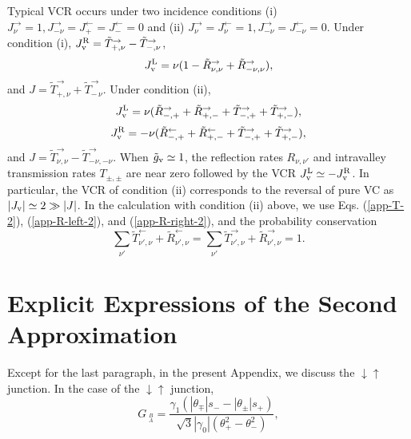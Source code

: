 \documentclass{jpsj3}
\begin{document}
Typical VCR occurs under two incidence conditions (i)
$J_\nu^{\rightarrow} =1, J_{-\nu}^{\rightarrow}
=J_+^{\leftarrow} = J_-^{\leftarrow} =0$ 
and (ii) $J_\nu^{\rightarrow}=J_\nu^{\leftarrow} =1, J_{-\nu}^{\rightarrow}=J_{-\nu}^{\leftarrow} =0$.
Under condition (i), $J_{\rm v}^{\rm R} 
=\tilde{T}_{+,\nu}^\rightarrow-\tilde{T}_{-,\nu}^\rightarrow$,
\begin{equation}
J_{\rm v}^{\rm L} 
=\nu 
(1-\tilde{R}_{\nu,\nu}^\rightarrow+\tilde{R}_{-\nu,\nu}^\rightarrow),
\end{equation}
and $J
=\tilde{T}_{+,\nu}^\rightarrow+\tilde{T}_{-\,\nu}^\rightarrow$.
Under condition (ii), 
\begin{equation}
J_{\rm v}^{\rm L}
=\nu (
\tilde{R}_{-,+}^\rightarrow+\tilde{R}_{+,-}^\rightarrow
+
\tilde{T}_{-,+}^\rightarrow+\tilde{T}_{+,-}^\rightarrow
),
\end{equation}
\begin{equation}
J_{\rm v}^{\rm R}
=-\nu (
\tilde{R}_{-,+}^\leftarrow+\tilde{R}_{+,-}^\leftarrow
+
\tilde{T}_{-,+}^\rightarrow+\tilde{T}_{+,-}^\rightarrow
),
\end{equation}
and $J
=\tilde{T}_{\nu,\nu}^\rightarrow-\tilde{T}_{-\nu,-\nu}^\rightarrow$.
When $\tilde{g}_{\rm v} \simeq 1$, the reflection rates $R_{\nu,\nu'}$ and 
intravalley transmission rates $T_{\pm,\pm}$ are near zero followed by the VCR $J_{\rm v}^{\rm L}\simeq -J_{\rm v}^{\rm R}$.
In  particular, the VCR of condition (ii) corresponds to the reversal of pure VC as
$|J_{\rm v}| \simeq 2 \gg |J|$.
In the calculation with condition (ii) above, we use
Eqs. (\ref{app-T-2}), (\ref{app-R-left-2}), and (\ref{app-R-right-2}), 
and the probability conservation
\begin{equation}
\sum_{\nu'} \tilde{T}_{\nu',\nu}^\leftarrow+\tilde{R}_{\nu',\nu}^\leftarrow
=\sum_{\nu'} \tilde{T}_{\nu',\nu}^\rightarrow+\tilde{R}_{\nu',\nu}^\rightarrow=1.
\end{equation}







\section{Explicit Expressions of the Second Approximation} 
Except for the last paragraph, in the present Appendix, we  discuss the
$\downarrow\uparrow$ junction.
In the case of the $\downarrow\uparrow$ junction,
\begin{equation}
G_{\;^B_A}
=
\frac{\gamma_1(|\theta_\mp|s_- -|\theta_\pm|s_+)}
{\sqrt{3}|\gamma_0|(\theta_+^2-\theta_-^2)},
\label{G}
\end{equation}
\end{document}
